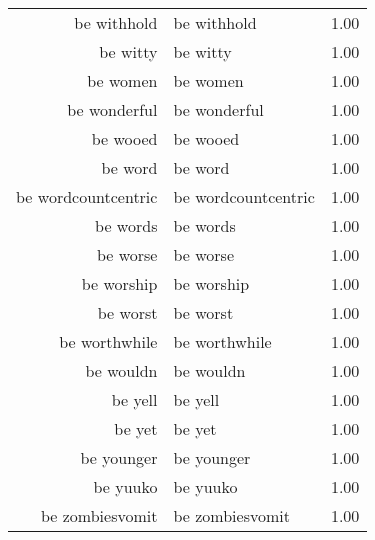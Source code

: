 \begin{table}[ht]
\begin{tabular}{rlr}
  be withhold & be withhold & 1.00 \\ 
  be witty & be witty & 1.00 \\ 
  be women & be women & 1.00 \\ 
  be wonderful & be wonderful & 1.00 \\ 
  be wooed & be wooed & 1.00 \\ 
  be word & be word & 1.00 \\ 
  be wordcountcentric & be wordcountcentric & 1.00 \\ 
  be words & be words & 1.00 \\ 
  be worse & be worse & 1.00 \\ 
  be worship & be worship & 1.00 \\ 
  be worst & be worst & 1.00 \\ 
  be worthwhile & be worthwhile & 1.00 \\ 
  be wouldn & be wouldn & 1.00 \\ 
  be yell & be yell & 1.00 \\ 
  be yet & be yet & 1.00 \\ 
  be younger & be younger & 1.00 \\ 
  be yuuko & be yuuko & 1.00 \\ 
  be zombiesvomit & be zombiesvomit & 1.00 \\ 
   \hline
\end{tabular}
\end{table}
